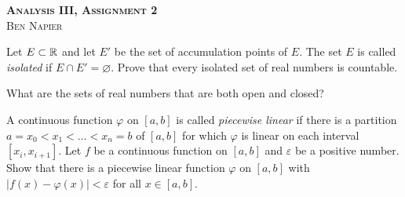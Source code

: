 \documentclass[a4paper, answers]{exam}
\begin{document}
\begin{center}
	\textbf{\textsc{Analysis III, Assignment 2}}
	\\
	\textsc{Ben Napier}
	\vspace{1em}
\end{center}
\begin{questions}
	\question Let $E \subset \mathbb{R}$ and let $E'$ be the set of accumulation points
	of $E$.
	The set $E$ is called \emph{isolated} if $E \cap E' = \varnothing$.
	Prove that every isolated set of real numbers is countable.

	\question What are the sets of real numbers that are both open and closed?

	\question A continuous function $\varphi$ on $[a,b]$ is called 
	\emph{piecewise linear} if there is a partition 
	$a = x_0 < x_1 < \ldots < x_n = b$ of $[a,b]$ for which $\varphi$ is linear
	on each interval $[x_i, x_{i+1}]$.
	Let $f$ be a continuous function on $[a,b]$ and $\varepsilon$ be a positive
	number.
	Show that there is a piecewise linear function $\varphi$ on $[a,b]$ with
	$\left\lvert f(x) - \varphi(x) \right\rvert < \varepsilon$ for all
	$x \in [a,b]$.
\end{questions}
\end{document}
